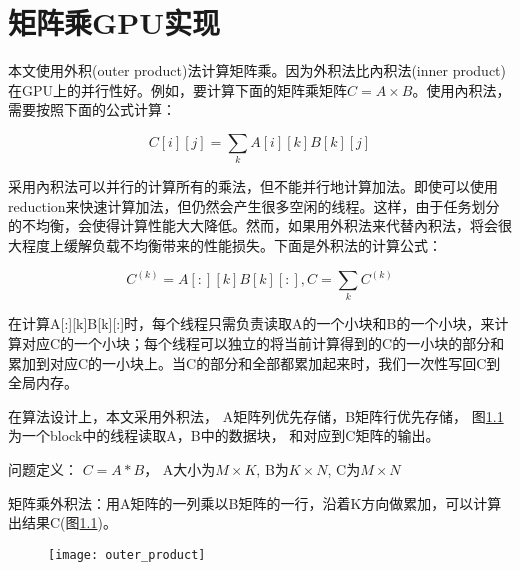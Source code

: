 \chapter{矩阵乘GPU实现}\label{chap:GEMMGPU}

本文使用外积(outer product)法计算矩阵乘。因为外积法比內积法(inner product)在GPU上的并行性好。例如，要计算下面的矩阵乘矩阵$C=A \times B$。使用內积法，需要按照下面的公式计算：

\begin{equation}
\label{eq:innerproduct}
C[i][j]=\sum_{k}A[i][k]B[k][j]
\end{equation}

采用內积法可以并行的计算所有的乘法，但不能并行地计算加法。即使可以使用reduction来快速计算加法，但仍然会产生很多空闲的线程。这样，由于任务划分的不均衡，会使得计算性能大大降低。然而，如果用外积法来代替內积法，将会很大程度上缓解负载不均衡带来的性能损失。下面是外积法的计算公式：

\begin{equation}
\label{eq:outerproduct}
C^{(k)}=A[:][k]B[k][:], C=\sum_{k}C^{(k)}
\end{equation}

在计算A[:][k]B[k][:]时，每个线程只需负责读取A的一个小块和B的一个小块，来计算对应C的一个小块；每个线程可以独立的将当前计算得到的C的一小块的部分和累加到对应C的一小块上。当C的部分和全部都累加起来时，我们一次性写回C到全局内存。

在算法设计上，本文采用外积法， A矩阵列优先存储，B矩阵行优先存储， 图\ref{fig:outer_product}为一个block中的线程读取A，B中的数据块， 和对应到C矩阵的输出。

问题定义： $C = A * B$， A大小为$M \times K$, B为$K \times N$, C为$M \times N$

矩阵乘外积法：用A矩阵的一列乘以B矩阵的一行，沿着K方向做累加，可以计算出结果C(图\ref{fig:outer_product})。
\begin{figure}[htbp]
	\centering
	\texttt{[image: outer\_product]}
	\label{fig:outer_product}
\end{figure}
